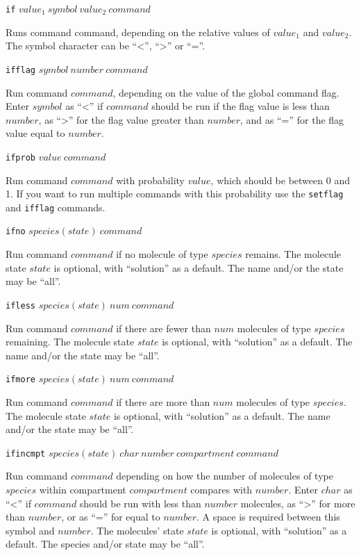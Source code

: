 \documentclass {scrbook}
\newcommand {\ttt} {\texttt}
\begin{document}
\begin{description}

\item{\ttt{if} $value_1\ symbol\ value_2\ command$}

Runs command command, depending on the relative values of $value_1$ and $value_2$. The symbol character can be ``<'', ``>'' or ``=''.

\item{\ttt{ifflag} $symbol\ number\ command$}

Run command $command$, depending on the value of the global command flag. Enter $symbol$ as ``<'' if $command$ should be run if the flag value is less than $number$, as ``>'' for the flag value greater than $number$, and as ``='' for the flag value equal to $number$.

\item{\ttt{ifprob} $value\ command$}

Run command $command$ with probability $value$, which should be between 0 and 1. If you want to run multiple commands with this probability use the \ttt{setflag} and \ttt{ifflag} commands.

\item{\ttt{ifno} $species(state)\ command$}

Run command $command$ if no molecule of type $species$ remains. The molecule state $state$ is optional, with ``solution'' as a default. The name and/or the state may be ``all''.

\item{\ttt{ifless} $species(state)\ num\ command$}

Run command $command$ if there are fewer than $num$ molecules of type $species$ remaining. The molecule state $state$ is optional, with ``solution'' as a default. The name and/or the state may be ``all''.

\item{\ttt{ifmore} $species(state)\ num\ command$}

Run command $command$ if there are more than $num$ molecules of type $species$. The molecule state $state$ is optional, with ``solution'' as a default. The name and/or the state may be ``all''.

\item{\ttt{ifincmpt} $species(state)\ char\ number\ compartment\ command$}

Run command $command$ depending on how the number of molecules of type $species$ within compartment $compartment$ compares with $number$. Enter $char$ as ``<'' if $command$ should be run with less than $number$ molecules, as ``>'' for more than $number$, or as ``='' for equal to $number$. A space is required between this symbol and $number$. The molecules' state $state$ is optional, with ``solution'' as a default. The species and/or state may be ``all''.


\end{description}
\end{document}
